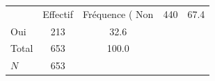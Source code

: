 {
\def\sym#1{\ifmmode^{#1}\else\(^{#1}\)\fi}
\begin{tabular}{l*{1}{cc}}
\toprule
            &    Effectif&Fréquence (%
\midrule
Non         &         440&        67.4\\
Oui         &         213&        32.6\\
Total       &         653&       100.0\\
\midrule
\(N\)       &         653&            \\
\bottomrule
\end{tabular}
}
